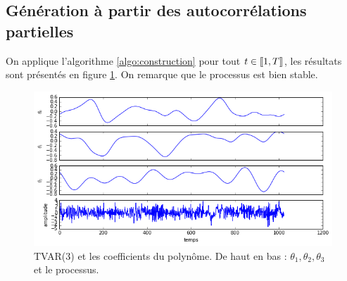 \documentclass{report}
\begin{document}
\subsection{Génération à partir des autocorrélations partielles}
On applique l'algorithme \ref{algo:construction} pour tout $t \in {\left\llbracket 1,T \right\rrbracket}$, les résultats sont présentés en figure \ref{fig:TVARd}. On remarque que le processus est bien stable.

\begin{figure}[h!]
\includegraphics[scale=0.8]{presentation/images/TVARd.png}
\caption{TVAR(3) et les coefficients du polynôme. De haut en bas : $\theta_1, \theta_2, \theta_3$ et le processus.}
\label{fig:TVARd}
\end{figure}
\end{document}
